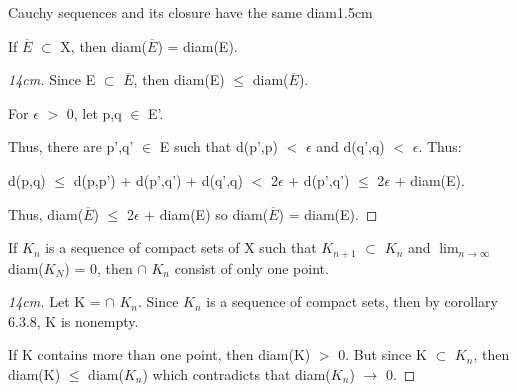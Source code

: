     \begin{ltheorem}{Cauchy sequences and its closure have the same diam}{1.5cm}
        \item If $\overline{E}$ $\subset$ X, then diam($\overline{E}$) = diam(E).
        
            \begin{proof}[14cm]
                Since E $\subset$ $\overline{E}$, then
                diam(E) $\leq$ diam($\overline{E}$).

                For $\epsilon$ $>$ 0, let p,q $\in$ E'.

                Thus, there are p',q' $\in$ E such that
                d(p',p) $<$ $\epsilon$ and d(q',q) $<$ $\epsilon$.
                Thus:

                d(p,q) $\leq$ d(p,p') + d(p',q') + d(q',q)
                $<$ 2$\epsilon$ + d(p',q')
                $\leq$ 2$\epsilon$ + diam(E).

                Thus, diam($\overline{E}$) $\leq$ 2$\epsilon$ + diam(E)
                so diam($\overline{E}$) = diam(E).                
            \end{proof}

        \item If $K_n$ is a sequence of compact sets of X such that
            $K_{n+1}$ $\subset$ $K_n$ and
            $\lim_{n \rightarrow \infty}$ diam($K_N$) = 0,
            then $\cap$ $K_n$ consist of only one point.

            \begin{proof}[14cm]
                Let K = $\cap$ $K_n$.
                Since $K_n$ is a sequence of compact sets, then
                by {\color{orange} corollary 6.3.8}, K is nonempty.

                If K contains more than one point, then diam(K) $>$ 0.
                But since K $\subset$ $K_n$, then diam(K) $\leq$ diam($K_n$)
                which contradicts that diam($K_n$) $\rightarrow$ 0.
            \end{proof}
    \end{ltheorem}

    \vspace{0.5cm}



